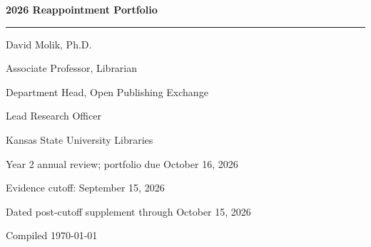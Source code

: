 \ifdefined\pagenumberwidth
  \settowidth{\pagenumberwidth}{\color{color2}\addressfont\itshape\strut
    \pageref{lastpage}/\pageref{lastpage}}
\fi

\thispagestyle{empty}
{\raggedright
    \vspace*{1.25in}

    {\color{color1}\LARGE\bfseries 2026 Reappointment Portfolio\par}
    \vspace{0.25in}

    {\color{color1}\rule{\textwidth}{1.5pt}}

    \vspace{0.75in}

    {\Large David Molik, Ph.D.\par}
    \vspace{0.15in}

    {\normalsize Associate Professor, Librarian\par}
    {\normalsize Department Head, Open Publishing Exchange\par}
    {\normalsize Lead Research Officer\par}
    {\normalsize Kansas State University Libraries\par}

    \vspace{0.75in}

    {\normalsize Year 2 annual review; portfolio due October 16, 2026\par}

    \vfill

    {\normalsize Evidence cutoff: September 15, 2026\par}
    {\normalsize Dated post-cutoff supplement through October 15, 2026\par}
    {\normalsize Compiled \today\par}
}
\newpage


\clearpage
\thispagestyle{empty}

